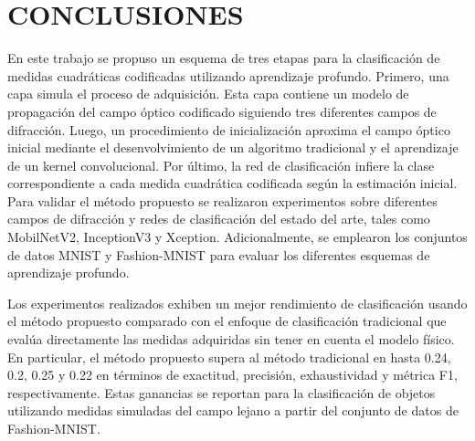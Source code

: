 
\chapter{CONCLUSIONES}


En este trabajo se propuso un esquema de tres etapas para la clasificación de medidas cuadráticas codificadas utilizando aprendizaje profundo. Primero, una capa simula el proceso de adquisición. Esta capa contiene un modelo de propagación del campo óptico codificado siguiendo tres diferentes campos de difracción. Luego, un procedimiento de inicialización aproxima el campo óptico inicial mediante el desenvolvimiento de un algoritmo tradicional y el aprendizaje de un kernel convolucional. Por último, la red de clasificación infiere la clase correspondiente a cada medida cuadrática codificada según la estimación inicial. Para validar el método propuesto se realizaron experimentos sobre diferentes campos de difracción y redes de clasificación del estado del arte, tales como MobilNetV2, InceptionV3 y Xception. Adicionalmente, se emplearon los conjuntos de datos MNIST y Fashion-MNIST para evaluar los diferentes esquemas de aprendizaje profundo.

Los experimentos realizados exhiben un mejor rendimiento de clasificación usando el método propuesto comparado con el enfoque de clasificación tradicional que evalúa directamente las medidas adquiridas sin tener en cuenta el modelo físico. En particular, el método propuesto supera al método tradicional en hasta 0.24, 0.2, 0.25 y 0.22 en términos de exactitud, precisión, exhaustividad y métrica F1, respectivamente. Estas ganancias se reportan para la clasificación de objetos utilizando medidas simuladas del campo lejano a partir del conjunto de datos de Fashion-MNIST.